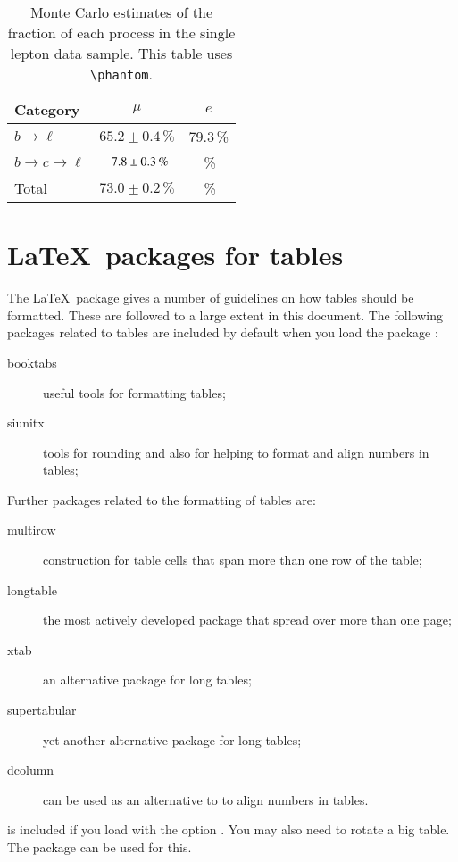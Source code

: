 \documentclass[REPORT=false, UKenglish]{atlasdoc}
\begin{document}
\begin{table}[htbp]
\begin{tcblisting}{}
  \caption{Monte Carlo estimates of the fraction of each process in
  the single lepton data sample.
  This table uses \texttt{\textbackslash phantom}.}%
  \label{tab:example2}
  \centering
  \begin{tabular}{lcc}
    \toprule
    Category             & \multicolumn{1}{c}{\(\mu\)} & \multicolumn{1}{c}{\(e\)}\\
    \midrule
    \(b \to \ell\)       & \(    65.2 \pm 0.4\,\%\)   &     79.3\,\% \\
    \(b \to c \to \ell\) & \(\pho 7.8 \pm 0.3\,\%\)   & \pho 5.4\,\% \\
    Total                & \(    73.0 \pm 0.2\,\%\)   & \pho 9.1\,\% \\
    \bottomrule
  \end{tabular}
\end{tcblisting}
\end{table}
  
  
\section{\LaTeX\ packages for tables}

The \LaTeX\ package  gives a number of guidelines on how tables should be formatted.
These are followed to a large extent in this document.
The following packages related to tables are included by default when you load the package :
\begin{description}
\item[booktabs] useful tools for formatting tables;
\item[siunitx] tools for rounding and also for helping to format and align numbers in tables;
\end{description}
Further packages related to the formatting of tables are:
\begin{description}
\item[multirow] construction for table cells that span more than one row of the table;
\item[longtable] the most actively developed package that spread over more than one page;
\item[xtab] an alternative package for long tables;
\item[supertabular] yet another alternative package for long tables;
\item[dcolumn] can be used as an alternative to  to align numbers in tables.
\end{description}
 is included if you load  with the option .
You may also need to rotate a big table.
The  package can be used for this.
\end{document}
